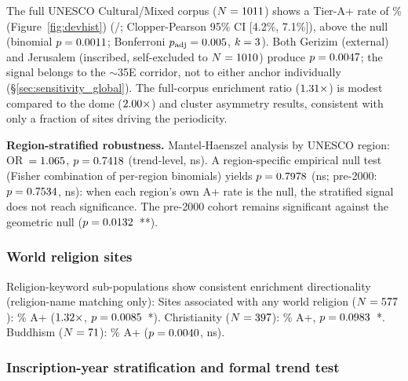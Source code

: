 \documentclass[HARVARD,twocolumn]{USG}
\begin{document}
The full UNESCO Cultural/Mixed corpus ($N = 1011$) shows a
Tier-A+ rate of \clusterApRate\% (Figure~\ref{fig:devhist})
(\NclusterAp/\NclusterTotal; Clopper-Pearson 95\% CI [4.2\%, 7.1\%]),
above the \NullRateAp{} null
(binomial $p = 0.0011$; Bonferroni $p_\mathrm{adj} = 0.005$,
$k = 3$).
Both Gerizim (external) and Jerusalem (inscribed, self-excluded to
$N = 1010$) produce $p = 0.0047$; the signal belongs to the
$\sim$35\textdegree{}E corridor, not to either anchor individually
(\S\ref{sec:sensitivity_global}).
The full-corpus enrichment ratio ($1.31\times$) is modest compared to
the dome ($2.00\times$) and cluster asymmetry results, consistent with
only a fraction of sites driving the periodicity.

\textbf{Region-stratified robustness.}
Mantel-Haenszel analysis by UNESCO region: OR~$= 1.065$,
$p = 0.7418$ (trend-level, ns). A region-specific empirical null test
(Fisher combination of per-region binomials) yields $p = 0.7978$
(ns; pre-2000: $p = 0.7534$, ns): when each region's own
A+ rate is the null, the stratified signal does not reach significance.
The pre-2000 cohort remains significant against the geometric null
($p = 0.0132$~**).

\subsubsection*{World religion sites}
Religion-keyword sub-populations show consistent enrichment directionality
(religion-name matching only):
Sites associated with any world religion ($N = 577$): \religUnionApRate\%
A+ ($1.32\times$, $p = 0.0085$~*).
Christianity ($N = 397$): \christApRate\% A+, $p = 0.0983$~*.
Buddhism ($N = 71$): \budApRateRelig\% A+ ($p = 0.0040$, ns).
\subsubsection*{Inscription-year stratification and formal trend test}
\label{sec:resultstemporal}
\end{document}
